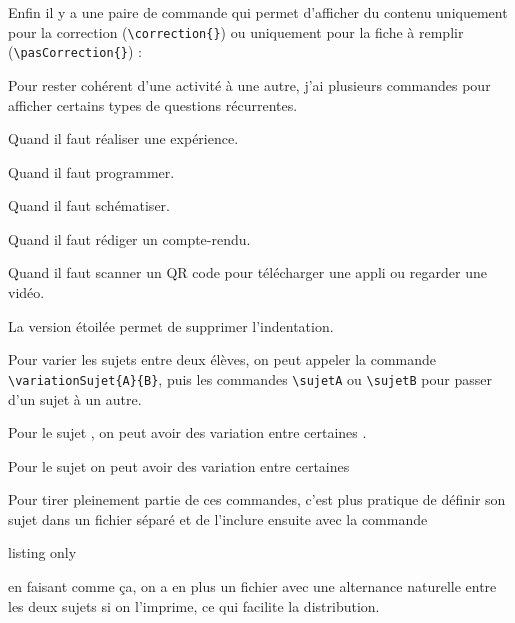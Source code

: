 Enfin il y a une paire de commande qui permet d'afficher du contenu uniquement pour la correction (\lstinline|\correction{}|) ou uniquement pour la fiche à remplir (\lstinline|\pasCorrection{}|) :
\begin{boiteCodeTex}{}

  \modeCorrection
  \modeEleve
\end{boiteCodeTex}


Pour rester cohérent d'une activité à une autre, j'ai plusieurs commandes pour afficher certains types de questions récurrentes.
\begin{boiteCodeTex}{}

  \mesure Quand il faut réaliser une expérience.

  \programmation Quand il faut programmer.

  \schematisation Quand il faut schématiser.

  \documentaire Quand il faut rédiger un compte-rendu.

  \telechargement Quand il faut scanner un QR code pour télécharger une appli ou regarder une vidéo.

  \mesure* La version étoilée permet de supprimer l'indentation.
\end{boiteCodeTex}


Pour varier les sujets entre deux élèves, on peut appeler la commande \lstinline|\variationSujet{A}{B}|, puis les commandes \lstinline|\sujetA| ou \lstinline|\sujetB| pour passer d'un sujet à un autre.
\begin{boiteCodeTex}{}
  \sujetA
  Pour le sujet , on peut avoir des variation entre certaines .
  
  \sujetB
  Pour le sujet  on peut avoir des variation entre certaines 
\end{boiteCodeTex}
Pour tirer pleinement partie de ces commandes, c'est plus pratique de définir son sujet dans un fichier séparé et de l'inclure ensuite avec la commande \lstinline||
\begin{boiteCodeTex}{listing only}
  \sujetA 
  \sujetB 
\end{boiteCodeTex}
en faisant comme ça, on a en plus un fichier avec une alternance naturelle entre les deux sujets si on l'imprime, ce qui facilite la distribution.

